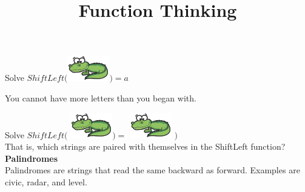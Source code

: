 \documentclass{ximera}
\title{Function Thinking}
\begin{document}
\begin{abstract}
\end{abstract}

\maketitle






\begin{question}
Solve $ShiftLeft($\includegraphics{pics/alligator.png}$) = a$
\begin{multipleChoice}
\end{multipleChoice}
\begin{feedback}
You cannot have more letters than you began with.
\end{feedback}
\end{question}




\begin{exploration}
Solve $ShiftLeft( $ \includegraphics{pics/alligator.png}$ ) = $ \includegraphics{pics/alligator.png} $)$ \\
That is, which strings are paired with themselves in the ShiftLeft function?
\quad \\

\textbf{Palindromes} \\
Palindromes are strings that read the same backward as forward.  Examples are civic, radar, and level.
\end{exploration}
\end{document}
